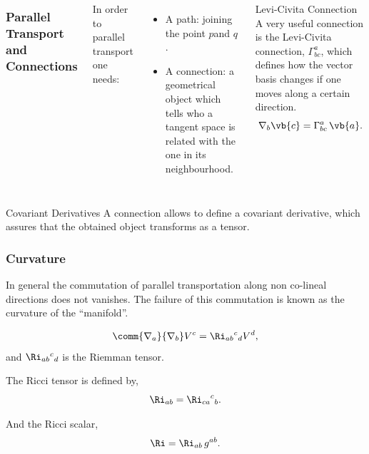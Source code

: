 \begin{frame}
  \begin{columns}
    \frametitle{Parallel Transport and Connections}
    In order to parallel transport one needs:
    \begin{itemize}
    \item \alert{A path}: joining the point $p$and $q$.
    \item \alert{A connection}: a geometrical object which tells who a tangent space  is related with the one in its neighbourhood.
    \end{itemize}
    \begin{alertblock}{Levi-Civita Connection}
      A very useful connection is the Levi-Civita connection, $\Gamma^a_{bc}$, which defines how the vector basis changes if one moves along a certain direction.$$\nabla_b \vb{c} = \Gamma^a_{b c}\,\vb{a}.$$
    \end{alertblock}
  \end{columns}

  \begin{block}{Covariant Derivatives}
    A connection allows to define a covariant derivative, which assures that the obtained object transforms as a tensor.
  \end{block}
\end{frame}

\begin{frame}
  \frametitle{Curvature}
  In general the commutation of parallel transportation along non co-lineal directions does not vanishes. The failure of this commutation is known as the \alert{curvature} of the ``manifold''.

$$\comm{\nabla_a}{\nabla_b}V^c= \Ri_{a b}{}^c{}_d V^d,$$
and $\Ri_{a b}{}^c{}_d$ is the Riemman tensor.

The Ricci tensor is defined by,$$\Ri_{a b}= \Ri_{c a}{}^c{}_b.$$

And the Ricci scalar,
\begin{align*}
  \Ri = \Ri_{ ab}\, g^{ab}.
\end{align*}
\end{frame}

